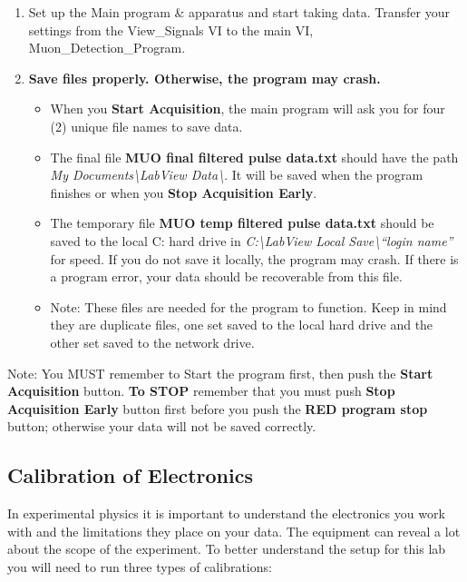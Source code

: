 \documentclass{../lab}
\begin{document}
\begin{enumerate}
    \item Set up the Main program \& apparatus and start taking data. Transfer your settings from the View\_Signals VI to the main VI, Muon\_Detection\_Program.

    \item \textbf{Save files properly. Otherwise, the program may crash.}

    \begin{itemize}
        \item When you \textbf{Start Acquisition}, the main program will ask you for four (2) unique file names to save data.

        \item The final file \textbf{MUO final filtered pulse data.txt} should have the path \emph{My Documents\textbackslash LabView Data\textbackslash}. It will be saved when the program finishes or when you \textbf{Stop Acquisition Early}.

        \item The temporary file \textbf{MUO temp filtered pulse data.txt} should be saved to the local C: hard drive in \emph{C:\textbackslash LabView Local Save\textbackslash``login name''} for speed. If you do not save it locally, the program may crash. If there is a program error, your data should be recoverable from this file.

        \item Note: These files are needed for the program to function. Keep in mind they are duplicate files, one set saved to the local hard drive and the other set saved to the network drive.

    \end{itemize}

\end{enumerate}

Note: You MUST remember to Start the program first, then push the \textbf{Start Acquisition} button. \textbf{To STOP} remember that you must push \textbf{Stop Acquisition Early} button first before you push the \textbf{RED program stop} button; otherwise your data will not be saved correctly.

\subsection{Calibration of Electronics}

In experimental physics it is important to understand the electronics you work with and the limitations they place on your data. The equipment can reveal a lot about the scope of the experiment. To better understand the setup for this lab you will need to run three types of calibrations:
\end{document}
